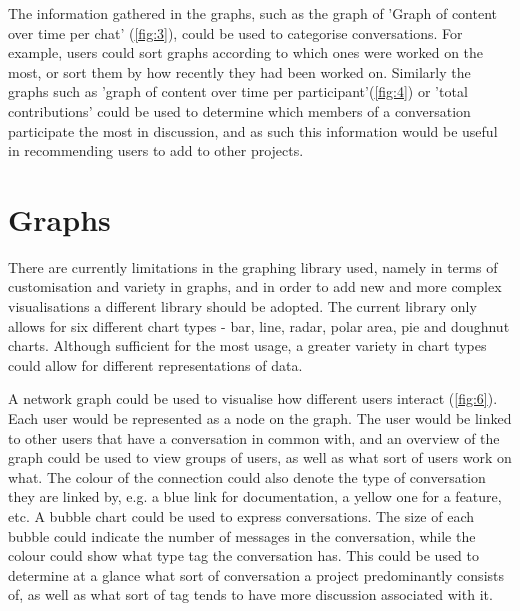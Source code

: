 \documentclass{l4proj}
\begin{document}
The information gathered in the graphs, such as the graph of 'Graph of content over time per chat' (\ref{fig:3}), could be used to categorise conversations.  For example, users could sort graphs according to which ones were worked on the most, or sort them by how recently they had been worked on.
Similarly the graphs such as 'graph of content over time per participant'(\ref{fig:4}) or 'total contributions' could be used to determine which members of a conversation participate the most in discussion, and as such this information would be useful in recommending users to add to other projects.

\newpage

\section {Graphs}
There are currently limitations in the graphing library used, namely in terms of customisation and variety in graphs, and in order to add new and more complex visualisations a different library should be adopted.  The current library only allows for six different chart types - bar, line, radar, polar area, pie and doughnut charts.  Although sufficient for the most usage, a greater variety in chart types could allow for different representations of data.


A network graph could be used to visualise how different users interact (\ref{fig:6}).  Each user would be represented as a node on the graph.  The user would be linked to other users that have a conversation in common with, and an overview of the graph could be used to view groups of users, as well as what sort of users work on what.  The colour of the connection could also denote the type of conversation they are linked by, e.g. a blue link for documentation, a yellow one for a feature, etc.
A bubble chart could be used to express conversations.  The size of each bubble could indicate the number of messages in the conversation, while the colour could show what type tag the conversation has.  This could be used to determine at a glance what sort of conversation a project predominantly consists of, as well as what sort of tag tends to have more discussion associated with it.
\end{document}
